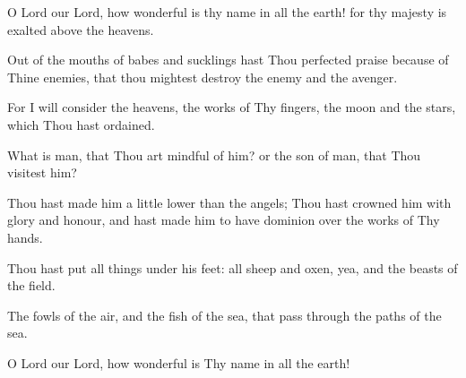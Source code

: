 O Lord our Lord, how wonderful is thy name in all the earth! for thy majesty is exalted above the heavens.

Out of the mouths of babes and sucklings hast Thou perfected praise because of Thine enemies, that thou mightest destroy the enemy and the avenger.

For I will consider the heavens, the works of Thy fingers, the moon and the stars, which Thou hast ordained.

What is man, that Thou art mindful of him? or the son of man, that Thou visitest him?

Thou hast made him a little lower than the angels; Thou hast crowned him with glory and honour, and hast made him to have dominion over the works of Thy hands.

Thou hast put all things under his feet: all sheep and oxen, yea, and the beasts of the field.

The fowls of the air, and the fish of the sea, that pass through the paths of the sea.

O Lord our Lord, how wonderful is Thy name in all the earth!
